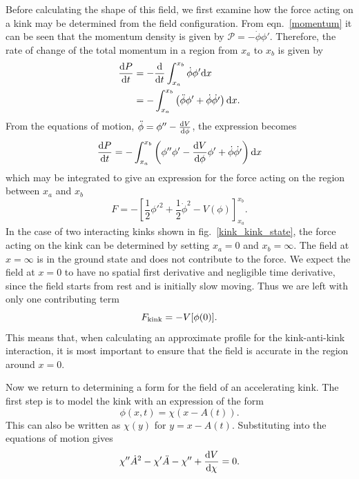 \documentclass[11pt, oneside]{article}  	%
\numberwithin{equation}{section}
\newcommand{\drv}{\ensuremath{\textup{d}}}
\begin{document}
Before calculating the shape of this field, we first examine how the force acting on a kink may be determined from the field configuration. From eqn.~\ref{momentum} it can be seen that the momentum density is given by $\mathcal{P} = -\dot{\phi}\phi'$. Therefore, the rate of change of the total momentum in a region from $x_a$ to $x_b$ is given by
\begin{align}
\frac{\drv P}{\drv t} &= -\frac{\drv}{\drv t} \int_{x_a}^{x_b} \dot{\phi}\phi' \drv x \\
 &= - \int_{x_a}^{x_b} \left ( \ddot{\phi}\phi' + \dot{\phi}\dot{\phi'} \right )\drv x.
\end{align}
From the equations of motion, $\ddot{\phi} = \phi'' - \frac{\drv V}{\drv\phi}$, the expression becomes
 \begin{equation}
\frac{\drv P}{\drv t} = - \int_{x_a}^{x_b} \left ( \phi'' \phi' - \frac{\drv V}{\drv\phi} \phi' + \dot{\phi}\dot{\phi'} \right )\drv x
\end{equation}
which may be integrated to give an expression for the force acting on the region between $x_a$ and $x_b$
\begin{equation}
F = -\left [ \frac{1}{2} \phi'^2 + \frac{1}{2} \dot{\phi}^2 - V(\phi) \right ]_{x_a}^{x_b}.
 \end{equation}
 In the case of two interacting kinks shown in fig.~\ref{kink_kink_state}, the force acting on the kink can be determined by setting $x_a = 0$ and $x_b = \infty$. The field at $ x =\infty$ is in the ground state and does not contribute to the force. We expect the field at $x=0$ to have no spatial first derivative and negligible time derivative, since the field starts from rest and is initially slow moving. Thus we are left with only one contributing term
 \begin{equation} \label{force}
F_\textup{kink} = - V[\phi(0)].
 \end{equation}
 This means that, when calculating an approximate profile for the kink-anti-kink interaction, it is most important to ensure that the field is accurate in the region around $x=0$.\par
 Now we return to determining a form for the field of an accelerating kink. The first step is to model the kink with an expression of the form
 \begin{equation}
 \phi(x,t) = \chi\left( x - A(t)\right).
 \end{equation}
 This can also be written as $\chi\left( y\right)$ for $y = x-A(t)$. Substituting into the equations of motion gives
 \begin{equation}
 \chi '' \dot{A}^2 - \chi'\ddot{A} - \chi '' + \frac{\drv V }{\drv \chi}=0.
 \end{equation}
\end{document}
